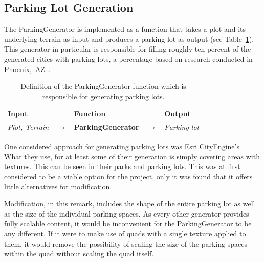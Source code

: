 \subsection{Parking Lot Generation}
The ParkingGenerator is implemented as a function that takes a plot and its underlying terrain as input and produces a parking lot as output (see Table~\ref{table:parking}).
This generator in particular is responsible for filling roughly ten percent of the generated cities with parking lots, a percentage based on research conducted in Phoenix,~AZ~\cite{parking_percent}.
\begin{table}[H]
   \centering
   \begin{tabular}{lllll}
     \textbf{Input}                           &               & \textbf{Function}            &               & \textbf{Output}         \\
     \midrule
     \textit{Plot, Terrain}                   & $\rightarrow$ & \textbf{ParkingGenerator}       & $\rightarrow$ & \textit{Parking lot}           \\
     \bottomrule
   \end{tabular}

   \caption{Definition of the ParkingGenerator function which is responsible for generating parking lots.}
   \label{table:parking}
 \end{table}
 \vspace{-0.4cm}

One considered approach for generating parking lots was Esri CityEngine's \cite{Esri}.  %
What they use, for at least some of their generation is simply covering areas with textures. This can be seen in their parks and parking lots. 
This was at first considered to be a viable option for the project, only it was found that it offers little alternatives for modification. 

Modification, in this remark, includes the shape of the entire parking lot as well as the size of the individual parking spaces.
As every other generator provides fully scalable content, it would be inconvenient for the ParkingGenerator to be any different.
If it were to make use of quads with a single texture applied to them, it would remove the possibility of scaling the size of the parking spaces within the quad without scaling the quad itself.

